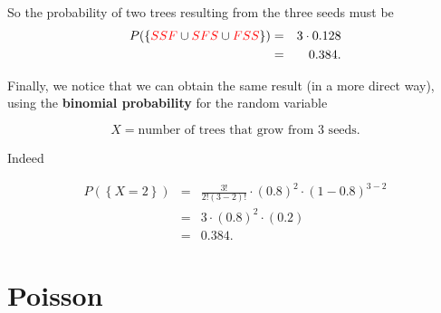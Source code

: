 \documentclass[smaller]{beamer}\usepackage[]{graphicx}\usepackage[]{color}
\renewcommand{\Pr}{P}
\begin{document}
\begin{frame}{\secname}
\begin{example}[continued]
\begin{footnotesize}
  So the probability of two trees resulting from the three seeds must be%
  \begin{eqnarray*}
  \Pr (\left\{
  \color{red}%
  SSF%
  \color{black}%
  \cup
  \color{red}%
  SFS%
  \color{black}%
  \cup
  \color{red}%
  FSS%
  \color{black}%
  \right\} ) &=&3\cdot 0.128 \\
  &=&0.384.
  \end{eqnarray*}
  \end{footnotesize}
  \end{example}
\end{frame}



\begin{frame}{\secname}

  \begin{example}
  \begin{footnotesize}
  Finally, we notice that we can obtain the same result (in a more direct way), using the \textbf{binomial probability} for the random variable

  $$X= \text{number of trees that grow from 3 seeds}.$$

  Indeed

  \begin{eqnarray*}
  \Pr (\left\{ X=2\right\})  &=&\frac{3!}{2!\left( 3-2\right) !}\cdot \left(
  0.8\right) ^{2} \cdot \left( 1-0.8\right) ^{3-2} \\
  &=&3 \cdot \left( 0.8\right) ^{2} \cdot \left( 0.2\right)  \\
  &=&0.384.
  \end{eqnarray*}
  \end{footnotesize}
  \end{example}


\end{frame}%

\section{Poisson}
\end{document}
